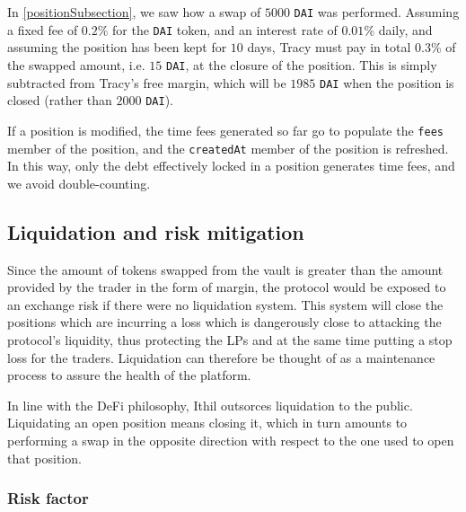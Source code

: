 \documentclass [10pt, fancyhdr, twoside] {article}
\begin{document}
In \ref{positionSubsection}, we saw how a swap of $5000$ \verb|DAI| was performed. Assuming a fixed fee of $0.2$\% for the \verb|DAI| token, and an interest rate of $0.01$\% daily, and assuming the position has been kept for $10$ days, Tracy must pay in total $0.3$\% of the swapped amount, i.e. $15$ \verb|DAI|, at the closure of the position. This is simply subtracted from Tracy's free margin, which will be $1985$ \verb|DAI| when the position is closed (rather than $2000$ \verb|DAI|).

If a position is modified, the time fees generated so far go to populate the \verb|fees| member of the position, and the \verb|createdAt| member of the position is refreshed. In this way, only the debt effectively locked in a position generates time fees, and we avoid double-counting.

\subsection{Liquidation and risk mitigation}\label{liquidationSubsection}

Since the amount of tokens swapped from the vault is greater than the amount provided by the trader in the form of margin, the protocol would be exposed to an exchange risk if there were no liquidation system. This system will close the positions which are incurring a loss which is dangerously close to attacking the protocol's liquidity, thus protecting the LPs and at the same time putting a stop loss for the traders. Liquidation can therefore be thought of as a maintenance process to assure the health of the platform.

In line with the DeFi philosophy, Ithil outsorces liquidation to the public. Liquidating an open position means closing it, which in turn amounts to performing a swap in the opposite direction with respect to the one used to open that position.

\subsubsection{Risk factor}\label{riskFactorSubsubsection}
\end{document}
